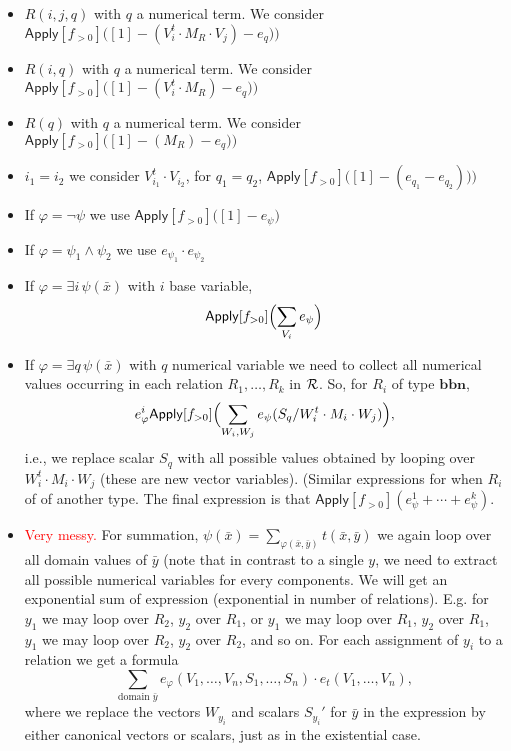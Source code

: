 \begin{itemize}
\item $R(i,j,q)$ with $q$ a numerical term. We consider  $\mathsf{Apply}[f_{>0}]\bigl([1]-(V_i^t\cdot M_R\cdot V_j)-e_q)\bigr)$
\item $R(i,q)$ with $q$ a numerical term. We consider  $\mathsf{Apply}[f_{>0}]\bigl([1]-(V_i^t\cdot M_R)-e_q)\bigr)$
\item $R(q)$ with $q$ a numerical term. We consider  $\mathsf{Apply}[f_{>0}]\bigl([1]-(M_R)-e_q)\bigr)$
\item $i_1=i_2$ we consider $V_{i_1}^t\cdot V_{i_2}$, for $q_1=q_2$,  $\mathsf{Apply}[f_{>0}]\bigl([1]-(e_{q_1}-e_{q_2}))\bigr)$
\item  If $\varphi=\neg \psi$ we use $\mathsf{Apply}[f_{>0}]\bigl([1]- e_\psi\bigr)$
\item  If $\varphi=\psi_1\land \psi_2$ we use $e_{\psi_1}\cdot e_{\psi_2}$
\item If $\varphi=\exists i\, \psi(\bar x)$ with $i$ base variable,
$$
\mathsf{Apply}[f_{>0}]\Bigl(\sum_{V_i} e_\psi  \Bigr)
$$
\item If $\varphi=\exists q\, \psi(\bar x)$ with $q$ numerical variable we need to collect all numerical values occurring in each relation $R_1,\ldots,R_k$ in ${\cal R}$.
So, for $R_i$ of type $\mathbf{b}\mathbf{b}\mathbf{n}$,
$$
e_\varphi^i\mathsf{Apply}[f_{>0}]\Bigl(\sum_{W_i,W_j} e_\psi(S_q/W_i^t\cdot M_i\cdot W_j)  \Bigr),
$$
i.e., we replace scalar $S_q$ with all possible values obtained by looping over $W_i^t\cdot M_i\cdot W_j$ (these are new vector variables).
(Similar expressions for when $R_i$ of of another type.
The final expression is  that  $\mathsf{Apply}[f_{>0}](e_\psi^1+\cdots+e_{\psi}^k)$.
\item \textcolor{red}{Very messy.} For summation, $\psi(\bar x)=\sum_{\varphi(\bar x,\bar y)} t(\bar x,\bar y)$  we again loop over all domain values of $\bar y$ (note that in contrast
to a single $y$, we need to extract all possible numerical variables for every components. We will get an exponential sum of expression (exponential in number
of relations). E.g. for $y_1$ we may loop over $R_2$, $y_2$ over $R_1$, or  $y_1$ we may loop over $R_1$, $y_2$ over $R_1$,  $y_1$ we may loop over $R_2$, $y_2$ over $R_2$,
and so on.  For each assignment of $y_i$ to a relation we get a formula
$$
\sum_{\text{domain $\bar y$}} e_\varphi(V_1,\ldots,V_n,S_1,\ldots,S_n)\cdot e_t(V_1,\ldots,V_n),
$$
where we replace the vectors $W_{y_i}$ and scalars $S_{y_i}'$ for $\bar y$ in the expression by either canonical vectors or scalars, just as in the existential case.
\end{itemize}

